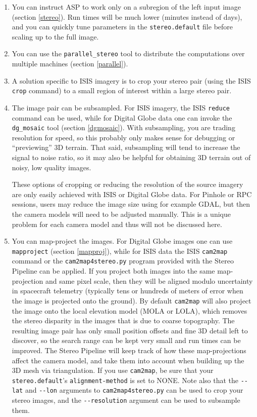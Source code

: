 \begin{enumerate}

\item You can instruct ASP to work only on a subregion of the left input
image (section \ref{stereo}). Run times will be much lower (minutes
instead of days), and you can quickly tune parameters in the
\texttt{stereo.default} file before scaling up to the full image.

\item You can use the \texttt{parallel\_stereo} tool to distribute the
  computations over multiple machines (section \ref{parallel}).

\item A solution specific to ISIS imagery is to crop your stereo pair
(using the ISIS \texttt{crop} command) to a small region of interest
within a large stereo pair.

\item The image pair can be subsampled. For ISIS imagery, the ISIS
\texttt{reduce} command can be used, while for Digital Globe data one
can invoke the \texttt{dg\_mosaic} tool (section \ref{dgmosaic}). With
subsampling, you are trading resolution for speed, so this probably only
makes sense for debugging or ``previewing'' 3D terrain. That said,
subsampling will tend to increase the signal to noise ratio, so it may
also be helpful for obtaining 3D terrain out of noisy, low quality images.

These options of cropping or reducing the resolution of the source
imagery are only easily achieved with ISIS or Digital Globe data. For
Pinhole or RPC sessions, users may reduce the image size using for
example GDAL, but then the camera models will need to be adjusted
manually. This is a unique problem for each camera model and thus will
not be discussed here.

\item You can map-project the images. For Digital Globe images one can
  use \texttt{mapproject} (section \ref{mapproj}), while for ISIS
  data the ISIS \texttt{cam2map} command or the \texttt{cam2map4stereo.py} program
provided with the Stereo Pipeline can be applied. If you project both images into the
same map-projection and same pixel scale, then they will be aligned
modulo uncertainty in spacecraft telemetry (typically tens or hundreds
of meters of error when the image is projected onto the ground).  By default
\texttt{cam2map} will also project the image onto the local elevation
model (MOLA or LOLA), which removes the stereo disparity in the images
that is due to coarse topography.  The resulting image pair has only
small position offsets and fine 3D detail left to discover, so the
search range can be kept very small and run times can be improved.
The Stereo Pipeline will keep track of how these map-projections affect the camera model, and take them into account when
building up the 3D mesh via triangulation.  If you use \texttt{cam2map},
be sure that your \texttt{stereo.default}'s \texttt{alignment-method} is
set to NONE.  Note also that the \texttt{-\/-lat} and \texttt{-\/-lon}
arguments to \texttt{cam2map4stereo.py} can be used to crop your stereo
images, and the \texttt{-\/-resolution} argument can be used to
subsample them.
\end{enumerate}

